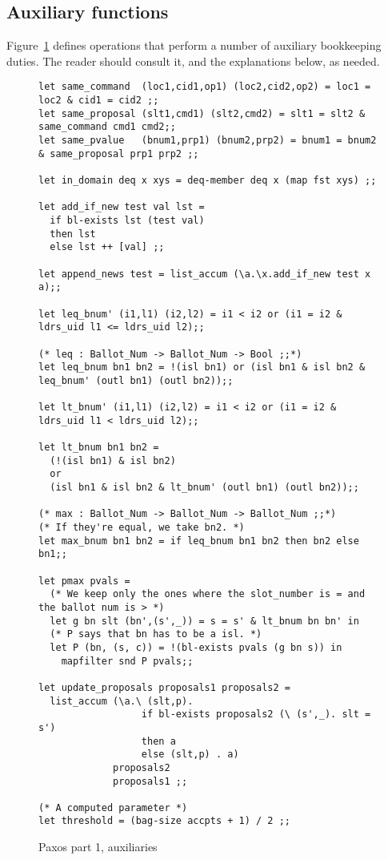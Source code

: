 \documentclass[final]{article}
\begin{document}
\subsection{Auxiliary functions}

Figure~\ref{fig:Paxos-auxiliaries-1} defines operations that perform a
number of auxiliary bookkeeping duties.  The reader should consult it,
and the explanations below, as needed.

\begin{figure}%
  \begin{lstlisting}[basicstyle=\small]
let same_command  (loc1,cid1,op1) (loc2,cid2,op2) = loc1 = loc2 & cid1 = cid2 ;;
let same_proposal (slt1,cmd1) (slt2,cmd2) = slt1 = slt2 & same_command cmd1 cmd2;;
let same_pvalue   (bnum1,prp1) (bnum2,prp2) = bnum1 = bnum2 & same_proposal prp1 prp2 ;;

let in_domain deq x xys = deq-member deq x (map fst xys) ;;

let add_if_new test val lst =
  if bl-exists lst (test val)
  then lst
  else lst ++ [val] ;;

let append_news test = list_accum (\a.\x.add_if_new test x a);;

let leq_bnum' (i1,l1) (i2,l2) = i1 < i2 or (i1 = i2 & ldrs_uid l1 <= ldrs_uid l2);;

(* leq : Ballot_Num -> Ballot_Num -> Bool ;;*)
let leq_bnum bn1 bn2 = !(isl bn1) or (isl bn1 & isl bn2 & leq_bnum' (outl bn1) (outl bn2));;

let lt_bnum' (i1,l1) (i2,l2) = i1 < i2 or (i1 = i2 & ldrs_uid l1 < ldrs_uid l2);;

let lt_bnum bn1 bn2 =
  (!(isl bn1) & isl bn2)
  or
  (isl bn1 & isl bn2 & lt_bnum' (outl bn1) (outl bn2));;

(* max : Ballot_Num -> Ballot_Num -> Ballot_Num ;;*)
(* If they're equal, we take bn2. *)
let max_bnum bn1 bn2 = if leq_bnum bn1 bn2 then bn2 else bn1;;

let pmax pvals =
  (* We keep only the ones where the slot_number is = and the ballot num is > *)
  let g bn slt (bn',(s',_)) = s = s' & lt_bnum bn bn' in
  (* P says that bn has to be a isl. *)
  let P (bn, (s, c)) = !(bl-exists pvals (g bn s)) in
    mapfilter snd P pvals;;

let update_proposals proposals1 proposals2 =
  list_accum (\a.\ (slt,p).
                  if bl-exists proposals2 (\ (s',_). slt = s')
                  then a
                  else (slt,p) . a)
             proposals2
             proposals1 ;;

(* A computed parameter *)
let threshold = (bag-size accpts + 1) / 2 ;;
  \end{lstlisting}
  \caption{Paxos part 1, auxiliaries}
  \label{fig:Paxos-auxiliaries-1}
\end{figure}
\end{document}
